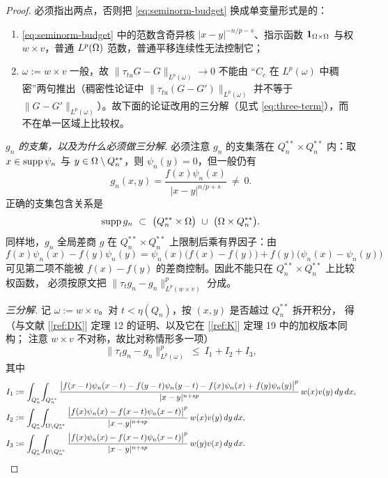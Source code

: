 \begin{proof}
必须指出两点，否则把 \eqref{eq:seminorm-budget} 换成单变量形式是的：
\begin{enumerate}[label=(\roman*)]
  \item \eqref{eq:seminorm-budget} 中的范数含奇异核 $|x-y|^{-n/p-s}$、指示函数 $\mathbf 1_{\Omega\times\Omega}$
        与权 $w\times v$，普通 $L^p(\Omega)$ 范数，普通平移连续性无法控制它；
  \item $\omega:=w\times v$ 一般，故 $\|\tau_{tu}G-G\|_{L^p(\omega)}\to0$ 不能由
        “$C_c$ 在 $L^p(\omega)$ 中稠密”两句推出（稠密性论证中 $\|\tau_{tu}(G-G')\|_{L^p(\omega)}$
        并不等于 $\|G-G'\|_{L^p(\omega)}$）。故下面的论证改用的三分解（见式 \eqref{eq:three-term}），而不在单一区域上比较权。
\end{enumerate}

\emph{$g_n$ 的支集，以及为什么必须做三分解.}
必须注意 $g_n$ 的支集落在 $Q_n^{**}\times Q_n^{**}$ 内：取
$x\in\operatorname{supp}\psi_n$ 与 $y\in\Omega\setminus Q_n^{**}$，则 $\psi_n(y)=0$，但一般仍有
\[
  g_n(x,y)=\frac{f(x)\psi_n(x)}{|x-y|^{n/p+s}}\ \ne\ 0 .
\]
正确的支集包含关系是
\begin{equation}\label{eq:gn-support}
  \operatorname{supp} g_n\ \subset\ \big(Q_n^{**}\times\Omega\big)\ \cup\ \big(\Omega\times Q_n^{**}\big).
\end{equation}
同样地，$g_n$ 全局差商 $g$ 在 $Q_n^{**}\times Q_n^{**}$ 上限制后乘有界因子：由
\begin{equation}\label{eq:gn-split}
  f(x)\psi_n(x)-f(y)\psi_n(y)
  =\psi_n(x)\bigl(f(x)-f(y)\bigr)+f(y)\bigl(\psi_n(x)-\psi_n(y)\bigr)
\end{equation}
可见第二项不能被 $f(x)-f(y)$ 的差商控制。因此不能只在 $Q_n^{**}\times Q_n^{**}$ 上比较权函数，
必须按原文把 $\|\tau_tg_n-g_n\|^p_{L^p(w\times v)}$ 分成。

\emph{三分解.} 记 $\omega:=w\times v$。对 $t<\eta(Q_n)$，按 $(x,y)$ 是否越过 $Q_n^{**}$ 拆开积分，
得（与文献 [\ref{ref:DK}] 定理 12 的证明、以及它在 [\ref{ref:K}] 定理 19 中的加权版本同构；
注意 $w\times v$ 不对称，故比对称情形多一项）
\begin{equation}\label{eq:three-term}
  \big\|\tau_tg_n-g_n\big\|^p_{L^p(\omega)}\ \le\ I_1+I_2+I_3 ,
\end{equation}
其中
\begin{align*}
  I_1&:=\int_{Q_n^{*}}\!\int_{Q_n^{**}}
   \frac{\bigl|f(x-t)\psi_n(x-t)-f(y-t)\psi_n(y-t)-f(x)\psi_n(x)+f(y)\psi_n(y)\bigr|^p}
        {|x-y|^{n+sp}}\,w(x)v(y)\,dy\,dx,\\
  I_2&:=\int_{Q_n^{*}}\!\int_{\Omega\setminus Q_n^{**}}
   \frac{\bigl|f(x)\psi_n(x)-f(x-t)\psi_n(x-t)\bigr|^p}
        {|x-y|^{n+sp}}\,w(x)v(y)\,dy\,dx,\\
  I_3&:=\int_{Q_n^{*}}\!\int_{\Omega\setminus Q_n^{**}}
   \frac{\bigl|f(x)\psi_n(x)-f(x-t)\psi_n(x-t)\bigr|^p}
        {|x-y|^{n+sp}}\,w(y)v(x)\,dy\,dx .
\end{align*}


\end{proof}
